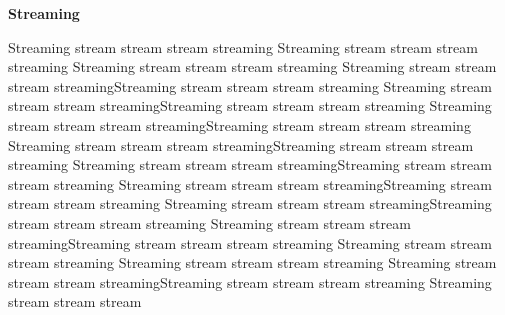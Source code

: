 \begin{center} \textbf{\huge Streaming} \end{center}
Streaming stream stream stream streaming Streaming stream stream stream streaming Streaming stream stream stream streaming Streaming stream stream stream streamingStreaming stream stream stream streaming Streaming stream stream stream streamingStreaming stream stream stream streaming Streaming stream stream stream streamingStreaming stream stream stream streaming Streaming stream stream stream streamingStreaming stream stream stream streaming Streaming stream stream stream streamingStreaming stream stream stream streaming Streaming stream stream stream streamingStreaming stream stream stream streaming Streaming stream stream stream streamingStreaming stream stream stream streaming Streaming stream stream stream streamingStreaming stream stream stream streaming Streaming stream stream stream streaming Streaming stream stream stream streaming Streaming stream stream stream streamingStreaming stream stream stream streaming Streaming stream stream stream 
